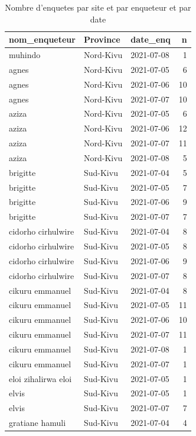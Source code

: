 \documentclass[
]{book}
\begin{document}
\begin{table}

\caption{\label{tab:unnamed-chunk-14}Nombre d'enquetes par site et par enqueteur et par date}
\centering
\begin{tabular}[t]{l|l|l|r}
\hline
nom\_enqueteur & Province & date\_enq & n\\
\hline
muhindo & Nord-Kivu & 2021-07-08 & 1\\
\hline
agnes & Nord-Kivu & 2021-07-05 & 6\\
\hline
agnes & Nord-Kivu & 2021-07-06 & 10\\
\hline
agnes & Nord-Kivu & 2021-07-07 & 10\\
\hline
aziza & Nord-Kivu & 2021-07-05 & 6\\
\hline
aziza & Nord-Kivu & 2021-07-06 & 12\\
\hline
aziza & Nord-Kivu & 2021-07-07 & 11\\
\hline
aziza & Nord-Kivu & 2021-07-08 & 5\\
\hline
brigitte & Sud-Kivu & 2021-07-04 & 5\\
\hline
brigitte & Sud-Kivu & 2021-07-05 & 7\\
\hline
brigitte & Sud-Kivu & 2021-07-06 & 9\\
\hline
brigitte & Sud-Kivu & 2021-07-07 & 7\\
\hline
cidorho cirhulwire & Sud-Kivu & 2021-07-04 & 8\\
\hline
cidorho cirhulwire & Sud-Kivu & 2021-07-05 & 8\\
\hline
cidorho cirhulwire & Sud-Kivu & 2021-07-06 & 9\\
\hline
cidorho cirhulwire & Sud-Kivu & 2021-07-07 & 8\\
\hline
cikuru emmanuel & Sud-Kivu & 2021-07-04 & 8\\
\hline
cikuru emmanuel & Sud-Kivu & 2021-07-05 & 11\\
\hline
cikuru emmanuel & Sud-Kivu & 2021-07-06 & 10\\
\hline
cikuru emmanuel & Sud-Kivu & 2021-07-07 & 11\\
\hline
cikuru emmanuel & Sud-Kivu & 2021-07-08 & 1\\
\hline
cikuru emmanuel & Sud-Kivu & 2021-07-07 & 1\\
\hline
eloi zihalirwa eloi & Sud-Kivu & 2021-07-05 & 1\\
\hline
elvis & Sud-Kivu & 2021-07-05 & 1\\
\hline
elvis & Sud-Kivu & 2021-07-07 & 7\\
\hline
gratiane hamuli & Sud-Kivu & 2021-07-04 & 4\\

\end{tabular}
\end{table}
\end{document}

